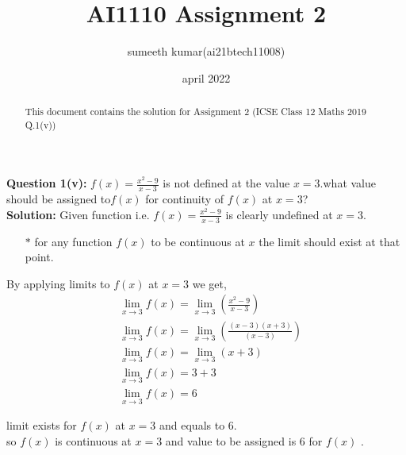 \documentclass[journel,11pt,two column]{IEEEtran}
\title{AI1110 Assignment 2 }
\author{sumeeth kumar(ai21btech11008)}
\date{april 2022}
\begin{document}
\maketitle

\begin{abstract}
This document contains the solution for Assignment 2 (ICSE Class 12 Maths 2019 Q.1(v))

\end{abstract}

\textbf{Question 1(v):}\vspace{1.1mm}
$f(x)=\frac{x^2-9}{x-3}$ is not defined at the value $x=3$.what value should be assigned to$f(x)$ for continuity of $f(x)$ at $x=3$?\\

\textbf{Solution:}
Given function i.e. $f(x)=\frac{x^2-9}{x-3}$ is clearly undefined at $x=3$.\\

\begin{itemize}
    \item[$\ast$] for any function $f(x)$ to be continuous at $x$ the limit should exist at that point.\\
\end{itemize}


 By applying limits to $f(x)$ at $x=3$ we get,
 \\
 \begin{align}
 &{\lim_{x\to 3}f(x)=\lim_{x\to3}\left(\frac{x^2-9}{x-3}\right)}\\[8pt]
 &{\lim_{x\to 3}f(x)=\lim_{x\to3}\left(\frac{(x-3)(x+3)}{(x-3)}\right)}\\[8pt]
 &{\lim_{x\to 3}f(x)=\lim_{x\to3}(x+3)}\\[8pt]
 &{\lim_{x\to 3}f(x)=3+3}\\[8pt]
 &{\lim_{x\to 3}f(x)=6}
 \end{align}

 limit exists for $f(x)$ at $x=3$ and equals to 6.\\
so $f(x)$ is continuous at $x=3$ and value  to be assigned is 6 for $f(x)$ .
\end{document}
